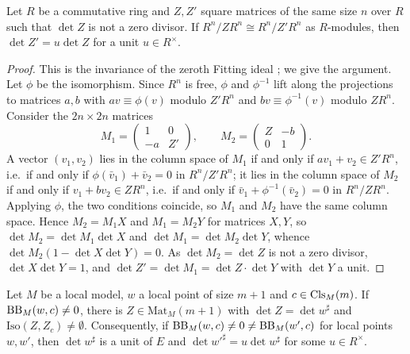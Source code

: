 \begin{lemma}\label{pf:thmS-leaves:lem:fitting}
Let $R$ be a commutative ring and $Z,Z'$ square matrices of the same size $n$ over $R$ such that $\det Z$ is not a
zero divisor. If $R^n/ZR^n\cong R^n/Z'R^n$ as $R$-modules, then $\det Z'=u\det Z$ for a unit $u\in R^\times$.
\end{lemma}

\begin{proof}
This is the invariance of the zeroth Fitting ideal \cite[Ch.~20]{Eisenbud1995}; we give the argument. Let $\phi$ be
the isomorphism. Since $R^n$ is free, $\phi$ and $\phi^{-1}$ lift along the projections to matrices $a,b$ with
$av\equiv\phi(v)$ modulo $Z'R^n$ and $bv\equiv\phi^{-1}(v)$ modulo $ZR^n$. Consider the $2n\times 2n$ matrices
\[
M_1=\begin{pmatrix}1&0\\-a&Z'\end{pmatrix},\qquad M_2=\begin{pmatrix}Z&-b\\0&1\end{pmatrix}.
\]
A vector $(v_1,v_2)$ lies in the column space of $M_1$ if and only if $av_1+v_2\in Z'R^n$, i.e.\ if and only if
$\phi(\bar v_1)+\bar v_2=0$ in $R^n/Z'R^n$; it lies in the column space of $M_2$ if and only if $v_1+bv_2\in ZR^n$, i.e.\
if and only if $\bar v_1+\phi^{-1}(\bar v_2)=0$ in $R^n/ZR^n$. Applying $\phi$, the two conditions coincide, so $M_1$ and
$M_2$ have the same column space. Hence $M_2=M_1X$ and $M_1=M_2Y$ for matrices $X,Y$, so $\det M_2=\det M_1\det X$ and
$\det M_1=\det M_2\det Y$, whence $\det M_2(1-\det X\det Y)=0$. As $\det M_2=\det Z$ is not a zero divisor,
$\det X\det Y=1$, and $\det Z'=\det M_1=\det Z\cdot\det Y$ with $\det Y$ a unit.
\end{proof}

\begin{lemma}\label{pf:thmS-leaves:lem:bbne}
Let $M$ be a local model, $w$ a local point of size $m+1$ and $c\in\mathrm{Cls}_M(m)$. If
$\mathrm{BB}_M(w,c)\ne0$, there is $Z\in\mathrm{Mat}_M(m+1)$ with $\det Z=\det w^\sharp$ and
$\mathrm{Iso}(Z,Z_c)\ne\emptyset$. Consequently, if $\mathrm{BB}_M(w,c)\ne0\ne\mathrm{BB}_M(w',c)$ for local points
$w,w'$, then $\det w^\sharp$ is a unit of $E$ and $\det w'^\sharp=u\det w^\sharp$ for some $u\in R^\times$.
\formallabel{Formalism.L2.SG.Pf.bb_ne}
\end{lemma}

